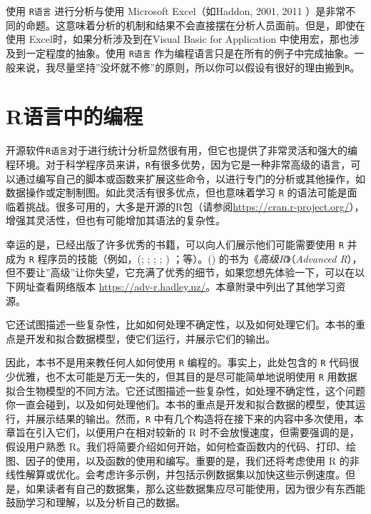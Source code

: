 \documentclass[
  lang=cn,
  11pt,
  scheme=chinese,
  chinesefont=nofont,
  citestyle=gb7714-2015,
  bibstyle=gb7714-2015]{elegantbook}
\begin{document}
使用 \texttt{R语言} 进行分析与使用 Microsoft Excel（如Haddon, 2001, 2011 ）是非常不同的命题。这意味着分析的机制和结果不会直接摆在分析人员面前。但是，即使在使用 Excel时，如果分析涉及到在Visual Basic for Application 中使用宏，那也涉及到一定程度的抽象。使用 \texttt{R语言} 作为编程语言只是在所有的例子中完成抽象。一般来说，我尽量坚持''没坏就不修''的原则，所以你可以假设有很好的理由搬到\texttt{R}。

\section{R语言中的编程}\label{rux8bedux8a00ux4e2dux7684ux7f16ux7a0b}

开源软件\texttt{R语言}对于进行统计分析显然很有用，但它也提供了非常灵活和强大的编程环境。对于科学程序员来讲，\texttt{R}有很多优势，因为它是一种非常高级的语言，可以通过编写自己的脚本或函数来扩展这些命令，以进行专门的分析或其他操作，如数据操作或定制制图。如此灵活有很多优点，但也意味着学习 \texttt{R} 的语法可能是面临着挑战。很多可用的，大多是开源的R包（请参阅\url{https://cran.r-project.org/}），增强其灵活性，但也有可能增加其语法的复杂性。

幸运的是，已经出版了许多优秀的书籍，可以向人们展示他们可能需要使用 \texttt{R} 并成为 \texttt{R} 程序员的技能（例如，(; ; ; ; ) ；等）。() 的书为《\emph{高级R}》（\emph{Advanced R}），但不要让''高级''让你失望，它充满了优秀的细节，如果您想先体验一下，可以在以下网址查看网络版本 \url{https://adv-r.hadley.nz/}。本章附录中列出了其他学习资源。

它还试图描述一些复杂性，比如如何处理不确定性，以及如何处理它们。本书的重点是开发和拟合数据模型，使它们运行，并展示它们的输出。

因此，本书不是用来教任何人如何使用 \texttt{R} 编程的。事实上，此处包含的 \texttt{R} 代码很少优雅，也不太可能是万无一失的，但其目的是尽可能简单地说明使用 \texttt{R} 用数据拟合生物模型的不同方法。它还试图描述一些复杂性，如处理不确定性，这个问题你一直会碰到，以及如何处理他们。本书的重点是开发和拟合数据的模型，使其运行，并展示结果的输出。然而，\texttt{R} 中有几个构造将在接下来的内容中多次使用，本章旨在引入它们，以便用户在相对较新的 R 时不会放慢速度，但需要强调的是，假设用户熟悉 R。我们将简要介绍如何开始，如何检查函数内的代码、打印、绘图、因子的使用，以及函数的使用和编写。重要的是，我们还将考虑使用 R 的非线性解算或优化。会考虑许多示例，并包括示例数据集以加快这些示例速度。但是，如果读者有自己的数据集，那么这些数据集应尽可能使用，因为很少有东西能鼓励学习和理解，以及分析自己的数据。
\end{document}
